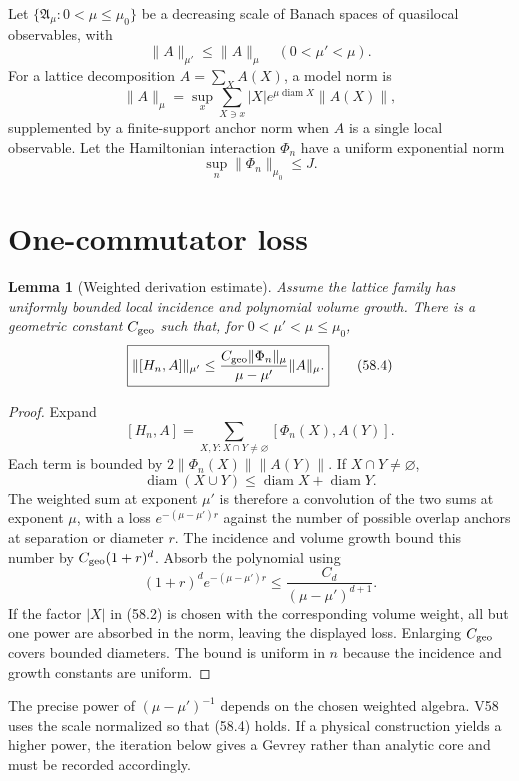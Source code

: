 \documentclass[11pt]{article}
\newtheorem{lemma}[theorem]{Lemma}
\theoremstyle{remark}
\begin{document}
Let \(\{{\mathfrak A}_\mu:0<\mu\leq\mu_0\}\) be a decreasing scale
of Banach spaces of quasilocal observables, with
\[
 \|A\|_{\mu'}\leq\|A\|_\mu
 \quad(0<\mu'<\mu).                                     \tag{58.1}
\]
For a lattice decomposition \(A=\sum_XA(X)\), a model norm is
\[
 \|A\|_\mu=
 \sup_x\sum_{X\ni x}|X|e^{\mu\operatorname{diam}X}
 \|A(X)\|,                                               \tag{58.2}
\]
supplemented by a finite-support anchor norm when \(A\) is a single
local observable.  Let the Hamiltonian interaction \(\Phi_n\) have
a uniform exponential norm
\[
 \sup_n\|\Phi_n\|_{\mu_0}\leq J.                        \tag{58.3}
\]

\section{One-commutator loss}

\begin{lemma}[Weighted derivation estimate]
\label{lem:v15v58-derivation}
Assume the lattice family has uniformly bounded local incidence and
polynomial volume growth.  There is a geometric constant
\(C_{\rm geo}\) such that, for
\(0<\mu'<\mu\leq\mu_0\),
\[
 \boxed{
 \|[H_n,A]\|_{\mu'}
 \leq
 \frac{C_{\rm geo}\|\Phi_n\|_\mu}{\mu-\mu'}
 \|A\|_\mu.}                                            \tag{58.4}
\]
\end{lemma}

\begin{proof}
Expand
\[
 [H_n,A]=\sum_{X,Y:X\cap Y\neq\varnothing}
 [\Phi_n(X),A(Y)].                                      \tag{58.5}
\]
Each term is bounded by
\(2\|\Phi_n(X)\|\|A(Y)\|\).  If \(X\cap Y\neq\varnothing\),
\[
 \operatorname{diam}(X\cup Y)
 \leq\operatorname{diam}X+\operatorname{diam}Y.         \tag{58.6}
\]
The weighted sum at exponent \(\mu'\) is therefore a convolution of
the two sums at exponent \(\mu\), with a loss
\(e^{-(\mu-\mu')r}\) against the number of possible overlap
anchors at separation or diameter \(r\).  The incidence and volume
growth bound this number by \(C_{\rm geo}(1+r)^d\).  Absorb the
polynomial using
\[
 (1+r)^de^{-(\mu-\mu')r}
 \leq\frac{C_d}{(\mu-\mu')^{d+1}}.
\]
If the factor \(|X|\) in (58.2) is chosen with the corresponding
volume weight, all but one power are absorbed in the norm, leaving
the displayed loss.  Enlarging \(C_{\rm geo}\) covers bounded
diameters.  The bound is uniform in \(n\) because the incidence and
growth constants are uniform.
\end{proof}

The precise power of \((\mu-\mu')^{-1}\) depends on the chosen
weighted algebra.  V58 uses the scale normalized so that (58.4)
holds.  If a physical construction yields a higher power, the
iteration below gives a Gevrey rather than analytic core and must be
recorded accordingly.
\end{document}
